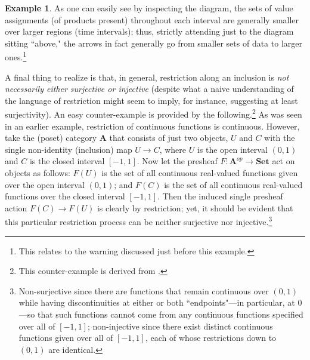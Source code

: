 \documentclass[11pt]{book}
\theoremstyle{definition}
\newtheorem{example}{Example}[section]
\theoremstyle{definition}
\theoremstyle{definition}
\theoremstyle{theorem}
\theoremstyle{definition}
\begin{document}
\begin{example}
As one can easily see by inspecting the diagram, the sets of value assignments (of products present) throughout each interval are generally smaller over larger regions (time intervals); thus, strictly attending just to the diagram sitting ``above," the arrows in fact generally go from smaller sets of data to larger ones.\footnote{This relates to the warning discussed just before this example.} \par 
A final thing to realize is that, in general, restriction along an inclusion is \textit{not necessarily either surjective or injective} (despite what a naive understanding of the language of restriction might seem to imply, for instance, suggesting at least surjectivity). An easy counter-example is provided by the following.\footnote{This counter-example is derived from \cite{lawvere_sets_2003}.} As was seen in an earlier example, restriction of continuous functions is continuous. However, take the (poset) category $\textbf{A}$ that consists of just two objects, $U$ and $C$ with the single non-identity (inclusion) map $U \rightarrow C$, where $U$ is the open interval $(0,1)$ and $C$ is the closed interval $[-1,1]$. Now let the presheaf $F: \textbf{A}^{op} \rightarrow \textbf{Set}$ act on objects as follows: $F(U)$ is the set of all continuous real-valued functions given over the open interval $(0,1)$; and $F(C)$ is the set of all continuous real-valued functions over the closed interval $[-1,1]$. Then the induced single presheaf action $F(C) \rightarrow F(U)$ is clearly by restriction; yet, it should be evident that this particular restriction process can be neither surjective nor injective.\footnote{Non-surjective since there are functions that remain continuous over $(0,1)$ while having discontinuities at either or both ``endpoints"---in particular, at $0$---so that such functions cannot come from any continuous functions specified over all of $[-1,1]$; non-injective since there exist distinct continuous functions given over all of $[-1,1]$, each of whose restrictions down to $(0,1)$ are identical.}    
\end{example}  
\end{document}
